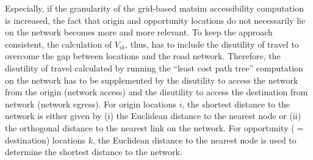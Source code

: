Especially, if the granularity of the grid-based \gls{matsim} accessibility computation is increased, the fact that 
origin and opportunity locations do not necessarily lie on the network becomes more and more relevant. To keep the 
approach consistent, the calculation of $V_{ik}$, thus, has to include the disutility of travel to overcome the gap 
between locations and the road network. Therefore, the disutility of travel calculated by running the ``least cost 
path tree'' computation on the network has to be supplemented by the disutility to access the network from the origin 
(network access) and the disutility to access the destination from network (network egress). For origin locations $i$, 
the shortest distance to the network is either given by (i) the Euclidean distance to the nearest node or (ii) the 
orthogonal distance to the nearest link on the network.
For opportunity ($=$ destination) locations $k$, the Euclidean distance to the nearest node is used to determine
the shortest distance to the network.

%


